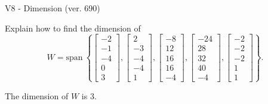 \begin{exercise}
  \begin{exerciseTitle}V8 - Dimension (ver. 690)\end{exerciseTitle}
  \begin{exerciseStatement}
    Explain how to find the dimension of 
\[W=\mathrm{span}\ \left\{\left[\begin{array}{r}
-2 \\
-1 \\
-4 \\
0 \\
3
\end{array}\right] , \left[\begin{array}{r}
2 \\
-3 \\
-4 \\
-4 \\
1
\end{array}\right] , \left[\begin{array}{r}
-8 \\
12 \\
16 \\
16 \\
-4
\end{array}\right] , \left[\begin{array}{r}
-24 \\
28 \\
32 \\
40 \\
-4
\end{array}\right] , \left[\begin{array}{r}
-2 \\
-2 \\
-2 \\
1 \\
1
\end{array}\right]\right\}.\]



  \end{exerciseStatement}
  \begin{exerciseAnswer}
   The dimension of \(W\) is  \(3\).
  


  \end{exerciseAnswer}
\end{exercise}